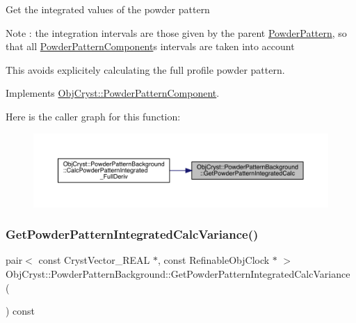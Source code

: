 Get the integrated values of the powder pattern

\begin{DoxyNote}{Note}
\+: the integration intervals are those given by the parent \mbox{\hyperlink{class_obj_cryst_1_1_powder_pattern}{Powder\+Pattern}}, so that all \mbox{\hyperlink{class_obj_cryst_1_1_powder_pattern_component}{Powder\+Pattern\+Component}}\textquotesingle{}s intervals are taken into account
\end{DoxyNote}
This avoids explicitely calculating the full profile powder pattern. 

Implements \mbox{\hyperlink{class_obj_cryst_1_1_powder_pattern_component_ac54b7ae5a177492de681afc2cbed72eb}{Obj\+Cryst\+::\+Powder\+Pattern\+Component}}.

Here is the caller graph for this function\+:
\nopagebreak
\begin{figure}[H]
\begin{center}
\leavevmode
\includegraphics[width=350pt]{class_obj_cryst_1_1_powder_pattern_background_add12004ddfd2cc22d4fe0c52304da709_icgraph}
\end{center}
\end{figure}
\mbox{\label{class_obj_cryst_1_1_powder_pattern_background_a8ccebd7f0a71a7994c60b6efb2b8ebc7}} 
\subsubsection{\texorpdfstring{GetPowderPatternIntegratedCalcVariance()}{GetPowderPatternIntegratedCalcVariance()}}
{\footnotesize\ttfamily pair$<$ const Cryst\+Vector\+\_\+\+R\+E\+AL $\ast$, const Refinable\+Obj\+Clock $\ast$ $>$ Obj\+Cryst\+::\+Powder\+Pattern\+Background\+::\+Get\+Powder\+Pattern\+Integrated\+Calc\+Variance (\begin{DoxyParamCaption}{ }\end{DoxyParamCaption}) const\hspace{0.3cm}{\ttfamily [virtual]}}

